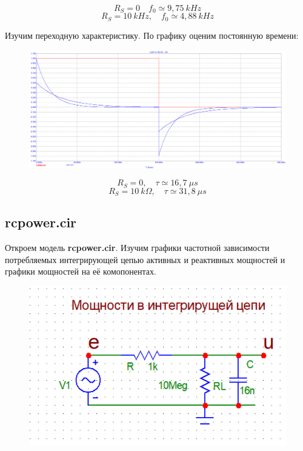 \documentclass{article}
\begin{document}
\[R_S = 0 \quad f_0 \simeq 9,75 \: kHz\]
\[R_S = 10 \: kHz, \quad f_0 \simeq 4,88 \: kHz\]

Изучим переходную характеристику. По графику оценим постоянную времени:

\begin{figure}[H]
\centering
\includegraphics[scale=0.4]{rcdiff_Transient.png}
\label{fig:Image1}
\end{figure}

\[R_S = 0, \quad \tau \simeq 16,7 \: \mu s\]
\[R_S = 10 \: k\Omega, \quad \tau \simeq 31,8 \: \mu s\]

\subsection{rcpower.cir}
Откроем модель \textbf{rcpower.cir}. Изучим графики частотной зависимости потребляемых интегрирующей цепью активных и реактивных мощностей и графики мощностей на её комопонентах.

\begin{figure}[H]
\centering
\includegraphics[scale=0.4]{rcpower_img.png}
\label{fig:Image1}
\end{figure}
\end{document}

